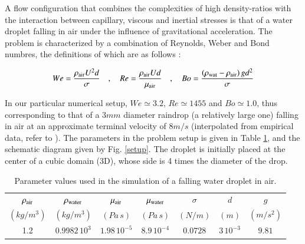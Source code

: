 
A flow configuration that combines the complexities of high density-ratios with the interaction between capillary, viscous and inertial stresses is that of a water droplet falling in air under the influence of gravitational acceleration. The problem is characterized by a combination of Reynolds, Weber and Bond numbres, the definitions of which are as follows : 

\begin{align}
We=\frac{\rho_{\rm air} U^2 d}{\sigma} \quad,\quad Re= \frac{\rho_{\rm air} U d}{\mu_{\rm air}} \quad,\quad Bo=\frac{\left(\rho_{\rm wat}-\rho_{\rm air}\right) g d^2 }{\sigma}
\end{align}

\vspace*{0.2cm}

In our particular numerical setup, $We \simeq 3.2 $, $Re \simeq 1455 $ and $Bo \simeq 1.0 $, thus corresponding to that of a $3mm$ diameter raindrop (a relatively large one) falling in air at an approximate terminal velocity of  $8 m/s$ (interpolated from empirical data, refer to  \cite{gunn1949terminal}). The parameters in the problem setup is given in Table \ref{raindropprop}, and the schematic diagram given by Fig. \ref{setup}. The droplet is initially placed at the center of a cubic domain (3D), whose side is 4 times the diameter of the drop. 

\vspace*{0.2cm}

\begin{table}[h!]
\begin{center}
\begin{tabular}{ccccccc}
\hline\hline
$\rho_{\rm air}$ & $\rho_{\rm water}$ & $\mu_{\rm air}$ 
& $\mu_{\rm water}$ & $\sigma$ & $d$ & $g$\\
$\left(kg/m^3\right)$ & $\left(kg/m^3\right)$ & $\left(Pa \, s\right)$ 
& $\left(Pa \,s \right)$ & $\left(N/m\right)$ & $(m)$ & $(m /s^{2})$ \\
\hline
1.2 & $0.9982\, 10^3$ & $1.98\,10^{-5}$ & 
$8.9 \, 10^{-4}$ & $0.0728$ & $3\, 10^{-3}$ & $9.81$\\
\hline\hline
\end{tabular}
\caption{Parameter values used in the simulation of a falling water droplet in air. \label{raindropprop}}
\end{center}
\end{table}

\vspace*{0.2cm}

